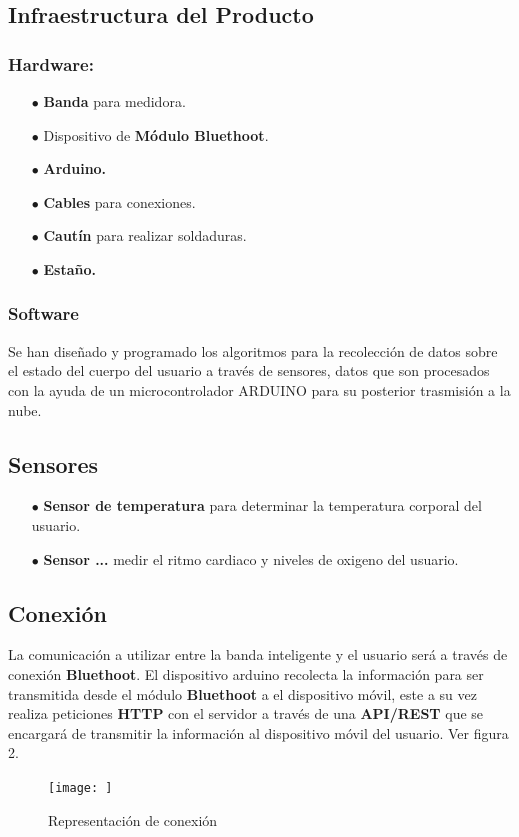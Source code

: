 \documentclass[osajnl,twocolumn,showpacs,superscriptaddress,10pt]{revtex4-1}
\begin{document}
\subsection{Infraestructura del Producto}
\subsubsection{Hardware:}
\begin{itemize}
    \item[$\bullet$]\textbf{Banda} para medidora.
    \item[$\bullet$]Dispositivo de \textbf{Módulo Bluethoot}.
    \item[$\bullet$]\textbf{Arduino.}
    \item[$\bullet$]\textbf{Cables} para conexiones.
    \item[$\bullet$]\textbf{Cautín} para realizar soldaduras.
    \item[$\bullet$]\textbf{Estaño.}
\end{itemize}
\subsubsection{Software}
    Se han diseñado y programado los algoritmos para la recolección de datos sobre el estado del cuerpo del usuario a través de sensores, datos que son procesados con la ayuda de un microcontrolador ARDUINO para su posterior trasmisión a la nube.
    
\subsection{Sensores}
\begin{itemize}
    \item[$\bullet$]\textbf{Sensor de temperatura} para determinar la temperatura corporal del usuario.
    \item[$\bullet$]\textbf{Sensor ...} medir el ritmo cardiaco y niveles de oxigeno del usuario.
\end{itemize}
\subsection{Conexión}
    La comunicación a utilizar entre la banda inteligente y el usuario será a través de conexión \textbf{Bluethoot}. El dispositivo arduino recolecta la información para ser transmitida desde el módulo \textbf{Bluethoot} a el dispositivo móvil, este a su vez realiza peticiones \textbf{HTTP} con el servidor a través de una \textbf{API/REST} que se encargará de transmitir la información al dispositivo móvil del usuario. Ver figura 2. \newline
\begin{figure} [H] \centering 
\caption{Representación de conexión}

\texttt{[image: ]} 
\end{figure}
\end{document}
